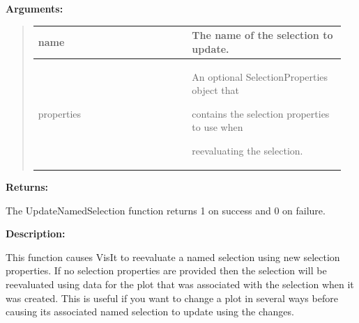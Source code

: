 \documentclass[letterpaper,10pt,english]{sphinxmanual}
\begin{document}
\begin{DUlineblock}{0em}
\item[] 
\item[] \textbf{Arguments:}
\end{DUlineblock}
\begin{quote}

\begin{tabular}{|p{0.475\linewidth}|p{0.475\linewidth}|}
\hline

name
 & 
The name of the selection to update.
\\
\hline
properties
 & 
\begin{DUlineblock}{0em}
\item[] An optional SelectionProperties object that
\item[] contains the selection properties to use when
\item[] reevaluating the selection.
\end{DUlineblock}
\\
\hline\end{tabular}

\end{quote}

\begin{DUlineblock}{0em}
\item[] 
\item[] \textbf{Returns:}
\item[] The UpdateNamedSelection function returns 1 on success and 0 on failure.
\item[] 
\item[] \textbf{Description:}
\item[] This function causes VisIt to reevaluate a named selection using new selection
properties. If no selection properties are provided then the selection will
be reevaluated using data for the plot that was associated with the selection
when it was created. This is useful if you want to change a plot in several
ways before causing its associated named selection to update using the changes.
\end{DUlineblock}

\begin{DUlineblock}{0em}
\item[] 
\end{DUlineblock}
\end{document}
